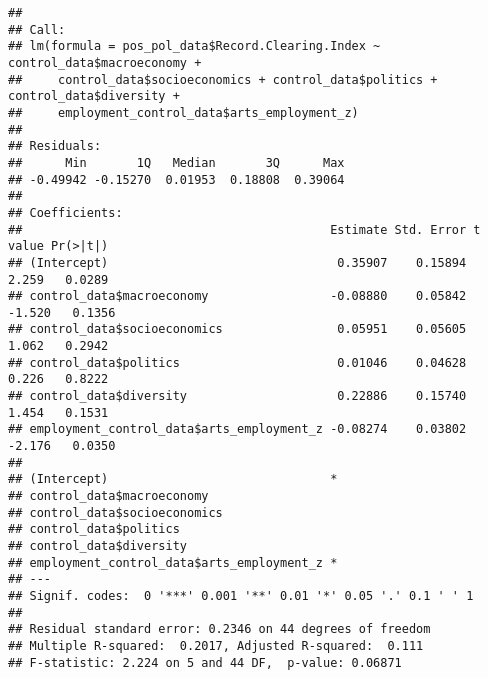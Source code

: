 \documentclass[
]{article}
\newenvironment{Shaded}{\begin{snugshade}}{\end{snugshade}}
\newcommand{\CommentTok}[1]{\textcolor[rgb]{0.56,0.35,0.01}{\textit{#1}}}
\newcommand{\FunctionTok}[1]{\textcolor[rgb]{0.13,0.29,0.53}{\textbf{#1}}}
\newcommand{\NormalTok}[1]{#1}
\newcommand{\OtherTok}[1]{\textcolor[rgb]{0.56,0.35,0.01}{#1}}
\newcommand{\SpecialCharTok}[1]{\textcolor[rgb]{0.81,0.36,0.00}{\textbf{#1}}}
\begin{document}
\begin{Shaded}
\end{Shaded}

\begin{verbatim}
## 
## Call:
## lm(formula = pos_pol_data$Record.Clearing.Index ~ control_data$macroeconomy + 
##     control_data$socioeconomics + control_data$politics + control_data$diversity + 
##     employment_control_data$arts_employment_z)
## 
## Residuals:
##      Min       1Q   Median       3Q      Max 
## -0.49942 -0.15270  0.01953  0.18808  0.39064 
## 
## Coefficients:
##                                           Estimate Std. Error t value Pr(>|t|)
## (Intercept)                                0.35907    0.15894   2.259   0.0289
## control_data$macroeconomy                 -0.08880    0.05842  -1.520   0.1356
## control_data$socioeconomics                0.05951    0.05605   1.062   0.2942
## control_data$politics                      0.01046    0.04628   0.226   0.8222
## control_data$diversity                     0.22886    0.15740   1.454   0.1531
## employment_control_data$arts_employment_z -0.08274    0.03802  -2.176   0.0350
##                                            
## (Intercept)                               *
## control_data$macroeconomy                  
## control_data$socioeconomics                
## control_data$politics                      
## control_data$diversity                     
## employment_control_data$arts_employment_z *
## ---
## Signif. codes:  0 '***' 0.001 '**' 0.01 '*' 0.05 '.' 0.1 ' ' 1
## 
## Residual standard error: 0.2346 on 44 degrees of freedom
## Multiple R-squared:  0.2017, Adjusted R-squared:  0.111 
## F-statistic: 2.224 on 5 and 44 DF,  p-value: 0.06871
\end{verbatim}
\end{document}
